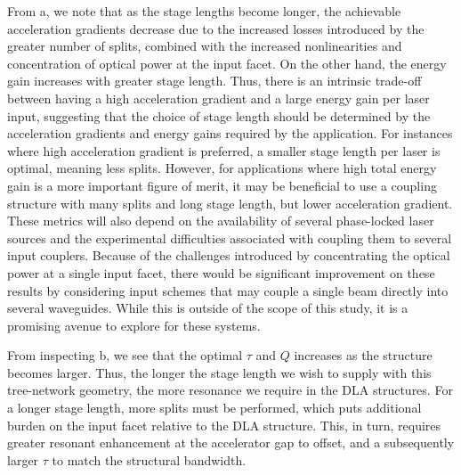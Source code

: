 
From a, we note that as the stage lengths become longer, the achievable acceleration gradients decrease due to the increased losses introduced by the greater number of splits, combined with the increased nonlinearities and concentration of optical power at the input facet. On the other hand, the energy gain increases with greater stage length. Thus, there is an intrinsic trade-off between having a high acceleration gradient and a large energy gain per laser input, suggesting that the choice of stage length should be determined by the acceleration gradients and energy gains required by the application. For instances where high acceleration gradient is preferred, a smaller stage length per laser is optimal, meaning less splits. However, for applications where high total energy gain is a more important figure of merit, it may be beneficial to use a coupling structure with many splits and long stage length, but lower acceleration gradient.  These metrics will also depend on the availability of several phase-locked laser sources and the experimental difficulties associated with coupling them to several input couplers.  Because of the challenges introduced by concentrating the optical power at a single input facet, there would be significant improvement on these results by considering input schemes that may couple a single beam directly into several waveguides.  While this is outside of the scope of this study, it is a promising avenue to explore for these systems.

From inspecting b, we see that the optimal $\tau$ and $Q$ increases as the structure becomes larger. Thus, the longer the stage length we wish to supply with this tree-network geometry, the more resonance we require in the DLA structures. For a longer stage length, more splits must be performed, which puts additional burden on the input facet relative to the DLA structure. This, in turn, requires greater resonant enhancement at the accelerator gap to offset, and a subsequently larger $\tau$ to match the structural bandwidth.

